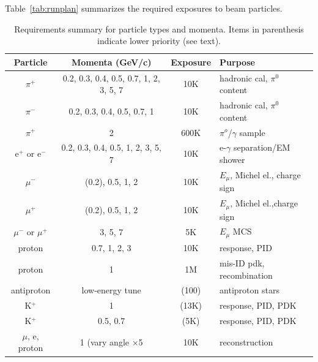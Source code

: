 Table~\ref{tab:runplan} summarizes the required exposures to beam particles.
\begin{table}[h]
\centering
\begin{tabular}{|c|c|c|l|}
\hline
Particle & Momenta (GeV/c) & Exposure & Purpose \\ \hline
$\pi^+$       & 0.2, 0.3, 0.4, 0.5, 0.7, 1, 2, 3, 5, 7     &  10K  & hadronic cal, $\pi^0$ content \\ \hline
$\pi^-$       &  0.2, 0.3, 0.4, 0.5, 0.7, 1     &  10K  & hadronic cal, $\pi^0$ content \\ \hline
$\pi^+$   &  2  &  600K & $\pi^o$/$\gamma$ sample \\ \hline
e$^+$ or e$^-$       &    0.2, 0.3, 0.4, 0.5, 1, 2, 3, 5, 7        &    10K   & e-$\gamma$ separation/EM shower     \\ \hline
$\mu^-$  &   (0.2), 0.5, 1, 2  &  10K & $E_\mu$, Michel el., charge sign \\ \hline
$\mu^+$ &   (0.2), 0.5, 1, 2   &  10K & $E_\mu$, Michel el.,charge sign  \\ \hline
$\mu^-$ or $\mu^+$ &   3, 5, 7  &  5K & $E_\mu$ MCS \\ \hline
proton &  0.7, 1, 2, 3   &  10K & response, PID \\ \hline
proton &  1   &  1M & mis-ID pdk, recombination \\ \hline
antiproton &  low-energy tune  &  (100) & antiproton stars \\ \hline
K$^+$  & 1 & (13K)   &   response, PID, PDK  \\ \hline
K$^+$  & 0.5, 0.7 & (5K)   &   response, PID, PDK  \\ \hline \hline
$\mu$, e, proton  & 1 (vary angle $\times$5 & 10K  & reconstruction  \\ \hline
\end{tabular}
\caption{Requirements summary for particle types and momenta. Items in parenthesis indicate lower priority (see text).
}
\label{tab:summaryphysics}
\end{table}



